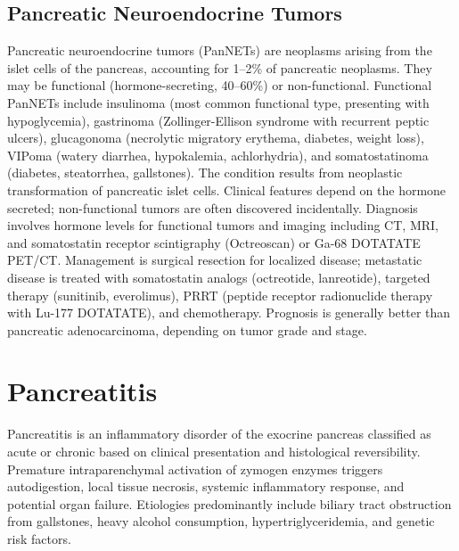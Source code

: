 \subsection{Pancreatic Neuroendocrine Tumors}
\label{sec:Pancreatic Neuroendocrine Tumors}
Pancreatic neuroendocrine tumors (PanNETs) are neoplasms arising from the islet cells of the pancreas, accounting for 1--2\% of pancreatic neoplasms. They may be functional (hormone-secreting, 40--60\%) or non-functional. Functional PanNETs include insulinoma (most common functional type, presenting with hypoglycemia), gastrinoma (Zollinger-Ellison syndrome with recurrent peptic ulcers), glucagonoma (necrolytic migratory erythema, diabetes, weight loss), VIPoma (watery diarrhea, hypokalemia, achlorhydria), and somatostatinoma (diabetes, steatorrhea, gallstones). The condition results from neoplastic transformation of pancreatic islet cells. Clinical features depend on the hormone secreted; non-functional tumors are often discovered incidentally. Diagnosis involves hormone levels for functional tumors and imaging including CT, MRI, and somatostatin receptor scintigraphy (Octreoscan) or Ga-68 DOTATATE PET/CT. Management is surgical resection for localized disease; metastatic disease is treated with somatostatin analogs (octreotide, lanreotide), targeted therapy (sunitinib, everolimus), PRRT (peptide receptor radionuclide therapy with Lu-177 DOTATATE), and chemotherapy. Prognosis is generally better than pancreatic adenocarcinoma, depending on tumor grade and stage.

\section{Pancreatitis}




Pancreatitis is an inflammatory disorder of the exocrine pancreas classified as acute or chronic based on clinical presentation and histological reversibility. Premature intraparenchymal activation of zymogen enzymes triggers autodigestion, local tissue necrosis, systemic inflammatory response, and potential organ failure. Etiologies predominantly include biliary tract obstruction from gallstones, heavy alcohol consumption, hypertriglyceridemia, and genetic risk factors.

